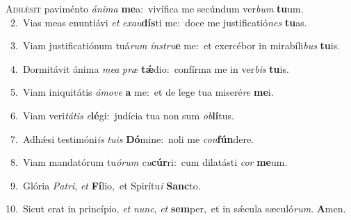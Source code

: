 \lettrine{\initial\textcolor{\initialcolor}{A}}{dhǽsit} paviménto \textit{á}\-\textit{ni}\textit{ma} \textbf{me}\-a:~\star vivífica me secúndum ver\textit{bum} \textbf{tu}\-um.\\
{\numbfont\textcolor{\numbcolor}{~2.}}~Vias meas enuntiávi \textit{et} \textit{ex}\-\textit{au}\textbf{dís}ti me:~\star doce me justificatió\textit{nes} \textbf{tu}\-as.\par
{\numbfont\textcolor{\numbcolor}{~3.}}~Viam justificatiónum tuá\textit{rum} \textit{ín}\-\textit{stru}\textbf{e} me:~\star et exercébor in mirabíli\textit{bus} \textbf{tu}\-is.\par
{\numbfont\textcolor{\numbcolor}{~4.}}~Dormitávit ánima \textit{me}\-\textit{a} \textit{præ} \textbf{tǽ}\-dio:~\star confírma me in ver\textit{bis} \textbf{tu}\-is.\par
{\numbfont\textcolor{\numbcolor}{~5.}}~Viam iniquitátis \textit{á}\-\textit{mo}\textit{ve} \textbf{a} me:~\star et de lege tua miseré\textit{re} \textbf{me}\-i.\par
{\numbfont\textcolor{\numbcolor}{~6.}}~Viam veri\-\textit{tá}\-\textit{tis} \textit{e}\-\textbf{lé}gi:~\star judícia tua non sum \textit{ob}\-\textbf{lí}tus.\par
{\numbfont\textcolor{\numbcolor}{~7.}}~Adhǽsi testimóni\textit{is} \textit{tu}\-\textit{is} \textbf{Dó}\-mine:~\star noli me \textit{con}\-\textbf{fún}dere.\par
{\numbfont\textcolor{\numbcolor}{~8.}}~Viam mandatórum tu\-\textit{ó}\-\textit{rum} \textit{cu}\-\textbf{cúr}ri:~\star cum dilatásti \textit{cor} \textbf{me}\-um.\par
{\numbfont\textcolor{\numbcolor}{~9.}}~Glória \textit{Pa}\-\textit{tri}, \textit{et} \textbf{Fí}\-lio,~\star et Spirítu\textit{i} \textbf{Sanc}\-to.\par
{\numbfont\textcolor{\numbcolor}{10.}}~Sicut erat in princípio, \textit{et} \textit{nunc}\-, \textit{et} \textbf{sem}\-per,~\star et in sǽcula sæculó\-\textit{rum}\-. \textbf{A}\-men.\par
